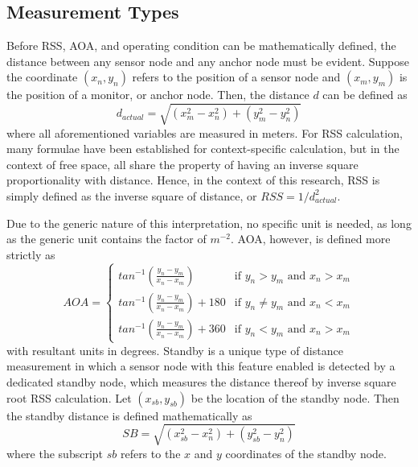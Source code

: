 \documentclass[12pt]{uthesis-v12}  %
\begin{document}
\subsection{Measurement Types}

Before RSS, AOA, and operating condition can be mathematically defined, the distance between any sensor node and any anchor node must be evident. Suppose the coordinate $(x_n,y_n)$ refers to the position of a sensor node and $(x_m,y_m)$ is the position of a monitor, or anchor node. Then, the distance $d$ can be defined as 
\begin{equation}
d_{actual} = \sqrt{(x_m^2 - x_n^2) + (y_m^2 - y_n^2)}
\label{dis}
\end{equation}
\noindent where all aforementioned variables are measured in meters. For RSS calculation, many formulae have been established for context-specific calculation, but in the context of free space, all share the property of having an inverse square proportionality with distance. Hence, in the context of this research, RSS is simply defined as the inverse square of distance, or $RSS = 1/d_{actual}^2$. 

Due to the generic nature of this interpretation, no specific unit is needed, as long as the generic unit contains the factor of $m^{-2}$. AOA, however, is defined more strictly as
\begin{equation}
 AOA =
  \begin{cases}
   tan^{-1}(\frac{y_n-y_m}{x_n-x_m}) & \text{if } y_n > y_m \text{ and } x_n > x_m \\
   tan^{-1}(\frac{y_n-y_m}{x_n-x_m}) + 180       & \text{if } y_n \neq y_m \text{ and } x_n < x_m \\
   tan^{-1}(\frac{y_n-y_m}{x_n-x_m}) + 360       & \text{if } y_n < y_m \text{ and } x_n > x_m
  \end{cases}
\label{aoa}
\end{equation}
\noindent with resultant units in degrees. Standby is a unique type of distance measurement in which a sensor node with this feature enabled is detected by a dedicated standby node, which measures the distance thereof by inverse square root RSS calculation. Let $(x_{sb},y_{sb})$ be the location of the standby node. Then the standby distance is defined mathematically as
\begin{equation}
SB = \sqrt{(x_{sb}^2 - x_n^2) + (y_{sb}^2 - y_n^2)}
\label{dis}
\end{equation}
where the subscript $sb$ refers to the $x$ and $y$ coordinates of the standby node.
\end{document}
